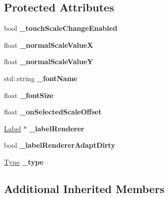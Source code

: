 \subsection*{Protected Attributes}
\begin{DoxyCompactItemize}
\item 
\mbox{\label{classui_1_1Text_abbbbb8291f3c68b780602b6fe852b232}} 
bool {\bfseries \+\_\+touch\+Scale\+Change\+Enabled}
\item 
\mbox{\label{classui_1_1Text_aa758a257142f7172477bde2d9d8ff0d1}} 
float {\bfseries \+\_\+normal\+Scale\+ValueX}
\item 
\mbox{\label{classui_1_1Text_a96a46addf991e034ab95c529f413906f}} 
float {\bfseries \+\_\+normal\+Scale\+ValueY}
\item 
\mbox{\label{classui_1_1Text_a62d5cf91da5760ad1a9d0af9163c6d43}} 
std\+::string {\bfseries \+\_\+font\+Name}
\item 
\mbox{\label{classui_1_1Text_a3228886dd80d90522e33f40370909695}} 
float {\bfseries \+\_\+font\+Size}
\item 
\mbox{\label{classui_1_1Text_ad797ef321faeb64f7a459c40fcc36cee}} 
float {\bfseries \+\_\+on\+Selected\+Scale\+Offset}
\item 
\mbox{\label{classui_1_1Text_ace3709c37cf1b58de8a8a402603bfdb4}} 
\hyperlink{classLabel}{Label} $\ast$ {\bfseries \+\_\+label\+Renderer}
\item 
\mbox{\label{classui_1_1Text_aaf88fc246883b7088e16f23a13109f6d}} 
bool {\bfseries \+\_\+label\+Renderer\+Adapt\+Dirty}
\item 
\mbox{\label{classui_1_1Text_a007a62f8d5fbc9492afdf8396d367b69}} 
\hyperlink{classui_1_1Text_a66074a2bf4b155f85115f944c6ff01ed}{Type} {\bfseries \+\_\+type}
\end{DoxyCompactItemize}
\subsection*{Additional Inherited Members}


